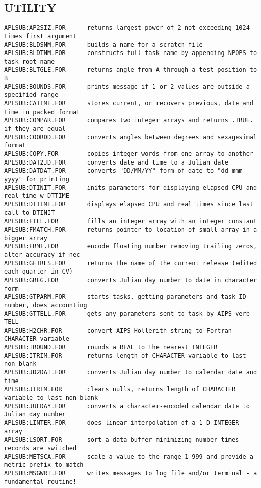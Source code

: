 \subsection{UTILITY}
\begin{verbatim}
APLSUB:AP2SIZ.FOR      returns largest power of 2 not exceeding 1024 times first argument
APLSUB:BLDSNM.FOR      builds a name for a scratch file
APLSUB:BLDTNM.FOR      constructs full task name by appending NPOPS to task root name
APLSUB:BLTGLE.FOR      returns angle from A through a test position to B
APLSUB:BOUNDS.FOR      prints message if 1 or 2 values are outside a specified range
APLSUB:CATIME.FOR      stores current, or recovers previous, date and time in packed format
APLSUB:COMPAR.FOR      compares two integer arrays and returns .TRUE. if they are equal
APLSUB:COORDD.FOR      converts angles between degrees and sexagesimal format
APLSUB:COPY.FOR        copies integer words from one array to another
APLSUB:DAT2JD.FOR      converts date and time to a Julian date
APLSUB:DATDAT.FOR      converts "DD/MM/YY" form of date to "dd-mmm-yyyy" for printing
APLSUB:DTINIT.FOR      inits parameters for displaying elapsed CPU and real time w DTTIME
APLSUB:DTTIME.FOR      displays elapsed CPU and real times since last call to DTINIT
APLSUB:FILL.FOR        fills an integer array with an integer constant
APLSUB:FMATCH.FOR      returns pointer to location of small array in a bigger array
APLSUB:FRMT.FOR        encode floating number removing trailing zeros, alter accuracy if nec
APLSUB:GETRLS.FOR      returns the name of the current release (edited each quarter in CV)
APLSUB:GREG.FOR        converts Julian day number to date in character form
APLSUB:GTPARM.FOR      starts tasks, getting parameters and task ID number, does accounting
APLSUB:GTTELL.FOR      gets any parameters sent to task by AIPS verb TELL
APLSUB:H2CHR.FOR       convert AIPS Hollerith string to Fortran CHARACTER variable
APLSUB:IROUND.FOR      rounds a REAL to the nearest INTEGER
APLSUB:ITRIM.FOR       returns length of CHARACTER variable to last non-blank
APLSUB:JD2DAT.FOR      converts Julian day number to calendar date and time
APLSUB:JTRIM.FOR       clears nulls, returns length of CHARACTER variable to last non-blank
APLSUB:JULDAY.FOR      converts a character-encoded calendar date to Julian day number
APLSUB:LINTER.FOR      does linear interpolation of a 1-D INTEGER array
APLSUB:LSORT.FOR       sort a data buffer minimizing number times records are switched
APLSUB:METSCA.FOR      scale a value to the range 1-999 and provide a metric prefix to match
APLSUB:MSGWRT.FOR      writes messages to log file and/or terminal - a fundamental routine!

\end{verbatim}

